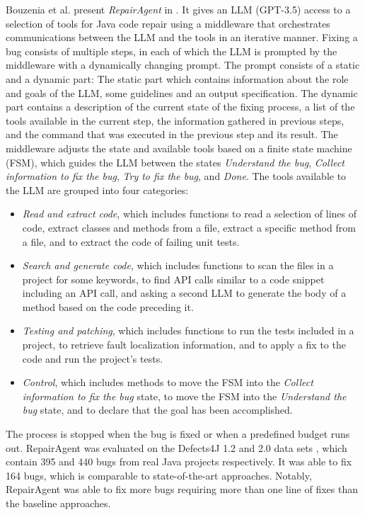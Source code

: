 \documentclass[11pt,titlepage,oneside,openany]{book}
\begin{document}
Bouzenia et al. present \emph{RepairAgent} in \cite{bouzenia_repairagent_2024}. It gives an LLM (GPT-3.5) access to a selection of tools for Java code repair using a middleware that orchestrates communications between the LLM and the tools in an iterative manner. Fixing a bug consists of multiple steps, in each of which the LLM is prompted by the middleware with a dynamically changing prompt. The prompt consists of a static and a dynamic part: The static part which contains information about the role and goals of the LLM, some guidelines and an output specification. The dynamic part contains a description of the current state of the fixing process, a list of the tools available in the current step, the information gathered in previous steps, and the command that was executed in the previous step and its result. The middleware adjusts the state and available tools based on a finite state machine (FSM), which guides the LLM between the states \emph{Understand the bug}, \emph{Collect information to fix the bug}, \emph{Try to fix the bug}, and \emph{Done}. The tools available to the LLM are grouped into four categories:
\begin{itemize}
	\item \emph{Read and extract code}, which includes functions to read a selection of lines of code, extract classes and methods from a file, extract a specific method from a file, and to extract the code of failing unit tests. 
	\item \emph{Search and generate code}, which includes functions to scan the files in a project for some keywords, to find API calls similar to a code snippet including an API call, and asking a second LLM to generate the body of a method based on the code preceding it.
	\item \emph{Testing and patching}, which includes functions to run the tests included in a project, to retrieve fault localization information, and to apply a fix to the code and run the project's tests.
	\item \emph{Control}, which includes methods to move the FSM into the \emph{Collect information to fix the bug} state, to move the FSM into the \emph{Understand the bug} state, and to declare that the goal has been accomplished.
\end{itemize}

The process is stopped when the bug is fixed or when a predefined budget runs out. RepairAgent was evaluated on the Defects4J 1.2 and 2.0 data sets \cite{just_defects4j_2014}, which contain 395 and 440 bugs from real Java projects respectively. It was able to fix 164 bugs, which is comparable to state-of-the-art approaches. Notably, RepairAgent was able to fix more bugs requiring more than one line of fixes than the baseline approaches. 
\end{document}
